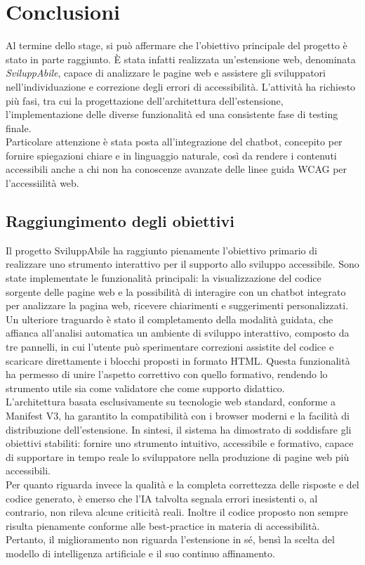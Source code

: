 \chapter{Conclusioni}
\label{chap:conclusioni}
\noindent Al termine dello stage, si può affermare che l’obiettivo principale del progetto è stato in parte raggiunto. È stata infatti realizzata un’estensione web, denominata \textit{SviluppAbile}, capace di analizzare le pagine web e assistere gli sviluppatori nell’individuazione e correzione degli errori di accessibilità. L’attività ha richiesto più fasi, tra cui la progettazione dell’architettura dell’estensione, l’implementazione delle diverse funzionalità ed una consistente fase di testing finale. \\Particolare attenzione è stata posta all’integrazione del chatbot, concepito per fornire spiegazioni chiare e in linguaggio naturale, così da rendere i contenuti accessibili anche a chi non ha conoscenze avanzate delle linee guida WCAG per l'accessiilità web.

\section{Raggiungimento degli obiettivi}
\noindent Il progetto SviluppAbile ha raggiunto pienamente l’obiettivo primario di realizzare uno strumento interattivo per il supporto allo sviluppo accessibile. Sono state implementate le funzionalità principali: la visualizzazione del codice sorgente delle pagine web e la possibilità di interagire con un chatbot integrato per analizzare la pagina web, ricevere chiarimenti e suggerimenti personalizzati.\\
Un ulteriore traguardo è stato il completamento della modalità guidata, che affianca all’analisi automatica un ambiente di sviluppo interattivo, composto da tre pannelli, in cui l’utente può sperimentare correzioni assistite del codice e scaricare direttamente i blocchi proposti in formato HTML. Questa funzionalità ha permesso di unire l’aspetto correttivo con quello formativo, rendendo lo strumento utile sia come validatore che come supporto didattico.\\
L’architettura basata esclusivamente su tecnologie web standard, conforme a Manifest V3, ha garantito la compatibilità con i browser moderni e la facilità di distribuzione dell’estensione. 
In sintesi, il sistema ha dimostrato di soddisfare gli obiettivi stabiliti: fornire uno strumento intuitivo, accessibile e formativo, capace di supportare in tempo reale lo sviluppatore nella produzione di pagine web più accessibili.\\
Per quanto riguarda invece la qualità e la completa correttezza delle risposte e del codice generato, è emerso che l’IA talvolta segnala errori inesistenti o, al contrario, non rileva alcune criticità reali. Inoltre il codice proposto non sempre risulta pienamente conforme alle best-practice in materia di accessibilità. Pertanto, il miglioramento non riguarda l’estensione in sé, bensì la scelta del modello di intelligenza artificiale e il suo continuo affinamento.

